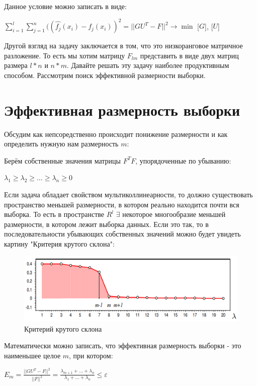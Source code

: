 Данное условие можно записать в виде: \par
$\displaystyle\sum_{i=1}^{l}\displaystyle\sum_{j=1}^{n} ((\hat{f_j}(x_i)-f_j(x_i))^2 = ||GU^T - F||^2 \rightarrow \min$ [$G$], [$U$]

Другой взгляд на задачу заключается в том, что это низкоранговое матричное разложение. То есть мы хотим матрицу $F_{lm}$ представить в виде двух матриц размера $l*n$ и $n*m$. Давайте решать эту задачу наиболее продуктивным способом. Рассмотрим поиск эффективной размерности выборки.

\section{Эффективная размерность выборки}
Обсудим как непсоредственно происходит понижение размерности и как определить нужную нам размерность $m$: \par

Берём собственные значения матрицы $F^TF$, упорядоченные по убыванию: \par
$\lambda_1 \geq \lambda_2 \geq \dotsc \geq \lambda_n \geq 0$ \par

Если задача обладает свойством мультиколлинеарности, то должно существовать пространство меньшей размерности, в котором реально находится почти вся выборка. То есть в пространстве $R^l$ $\exists$ некоторое многообразие меньшей размерности, в котором лежит выборка данных. Если это так, то в последовательности убывающих собственных значений можно будет увидеть картину "Критерия крутого склона": \par

\begin{figure}[h]
    \centering
    \includegraphics[width=1\linewidth]{chapters/pca/ing.png}
    \caption{Критерий крутого склона}
    \label{fig:enter-label}
\end{figure}

Математически можно записать, что эффективная размерность выборки - это наименьшее целое $m$, при котором: \par
$E_m = \frac{||GU^T-F||^2}{||F||^2} = \frac{\lambda_{m+1} + \dots + \lambda_{n}}{\lambda_{1} + \dots + \lambda_{n}} \leq \varepsilon$ \par

